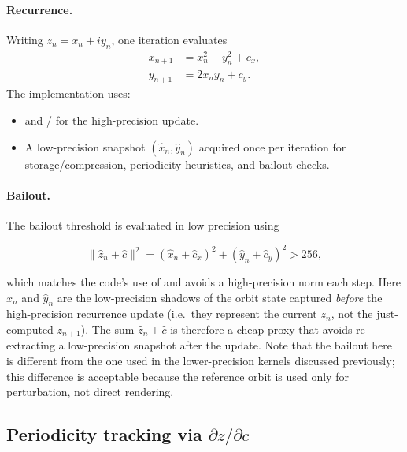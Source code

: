 \paragraph{Recurrence.}
Writing \(z_n = x_n + i y_n\), one iteration evaluates
\begin{align}
  x_{n+1} &= x_n^2 - y_n^2 + c_x, \label{eq:st-recurrence-real} \\
  y_{n+1} &= 2 x_n y_n + c_y. \label{eq:st-recurrence-imag}
\end{align}
The implementation uses:
\begin{itemize}
  \item {} and / for the high-precision update.
  \item A low-precision snapshot \((\hat{x}_n,\hat{y}_n)\) acquired once per iteration for storage/compression,
        periodicity heuristics, and bailout checks.
\end{itemize}

\paragraph{Bailout.}

The bailout threshold is evaluated in low precision using

\begin{equation}
  \lVert\hat{z}_n + \hat{c}\rVert^2 = (\hat{x}_n + \hat{c}_x)^2 + (\hat{y}_n + \hat{c}_y)^2 > 256,
  \label{eq:bailout-test}
\end{equation}

which matches the code's use of  and avoids a high-precision
norm each step.  Here \(\hat{x}_n\) and \(\hat{y}_n\) are the low-precision
shadows of the orbit state captured \emph{before} the high-precision recurrence
update (i.e.\ they represent the current \(z_n\), not the just-computed
\(z_{n+1}\)).  The sum \(\hat{z}_n + \hat{c}\) is therefore a cheap proxy that
avoids re-extracting a low-precision snapshot after the update.
Note that the bailout here is different from the one used in
the lower-precision kernels discussed previously; this difference is acceptable because the
reference orbit is used only for perturbation, not direct rendering.

\subsection{Periodicity tracking via \texorpdfstring{$\partial z/\partial c$}{dz/dc}}
\label{subsec:ref-orbit-periodicity}

